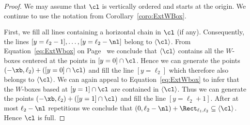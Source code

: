 \begin{proof}
We may assume that $\cl$ is vertically ordered and 
starts at the origin. We continue to use the notation from
Corollary~\ref{coro:ExtWBox}.

First, we fill all lines containing a horizontal chain in $\cl$
(if any). Consequently, the lines $[y=\ell_2-1],\ldots,[y=\ell_2-\nl ]$ 
belong to $\langle\cl\rangle$. From 
Equation~\eqref{eq:ExtWbox} on Page~\pageref{eq:ExtWbox}
we conclude that $\langle\cl\rangle$ contains all the $W$-boxes 
centered at the points in $[y=0]\cap\cl$. 
Hence we can generate the points $(-\xb,\ell_2)+([y=0]\cap\cl)$ 
and fill the line $[y=\ell_2]$ which therefore also belongs
to $\langle\cl\rangle$. We can again appeal to 
Equation~\eqref{eq:ExtWbox} to infer that the $W$-boxes based at
$[y=1]\cap\cl$ are contained in $\langle\cl\rangle$. Thus
we can generate the points $(-\xb,\ell_2)+([y=1]\cap\cl)$ 
and fill the line $[y=\ell_2+1]$. After at most $\ell_2-\nl$ 
repetitions we conclude that $(0,\ell_2-\nl)+\Rect_{\ell_1,\ell_2}
\subseteq\langle\cl\rangle$. Hence $\cl$ is full. 
\end{proof}
 
